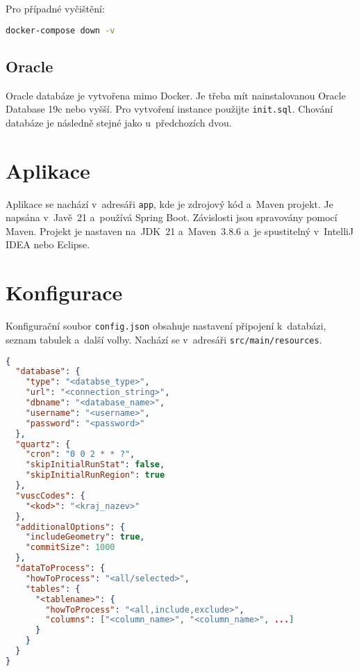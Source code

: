 Pro případné vyčištění:
\begin{lstlisting}[language=bash]
docker-compose down -v
\end{lstlisting}

\subsection*{Oracle}
Oracle databáze je vytvořena mimo Docker. Je třeba mít nainstalovanou Oracle Database 19c nebo vyšší. Pro vytvoření instance použijte \texttt{init.sql}. 
Chování databáze je následně stejné jako u~předchozích dvou.

\section*{Aplikace}
Aplikace se nachází v~adresáři \texttt{app}, kde je zdrojový kód a~Maven projekt. Je napsána v~Javě~21 a~používá Spring Boot. Závislosti jsou spravovány pomocí Maven. 
Projekt je nastaven na~JDK~21 a~Maven~3.8.6 a~je spustitelný v~IntelliJ IDEA nebo Eclipse.

\section*{Konfigurace}
Konfigurační soubor \texttt{config.json} obsahuje nastavení připojení k~databázi, seznam tabulek a~další volby. Nachází se v~adresáři \texttt{src/main/resources}.

\newpage

\begin{lstlisting}[language=json, caption={Příklad konfiguračního souboru}]
{
  "database": {
    "type": "<databse_type>",
    "url": "<connection_string>",
    "dbname": "<database_name>",
    "username": "<username>",
    "password": "<password>"
  },
  "quartz": {
    "cron": "0 0 2 * * ?",
    "skipInitialRunStat": false,
    "skipInitialRunRegion": true
  },
  "vuscCodes": {
    "<kod>": "<kraj_nazev>"
  },
  "additionalOptions": {
    "includeGeometry": true,
    "commitSize": 1000
  },
  "dataToProcess": {
    "howToProcess": "<all/selected>",
    "tables": {
      "<tablename>": {
        "howToProcess": "<all,include,exclude>",
        "columns": ["<column_name>", "<column_name>", ...]
      }
    }
  }
}
\end{lstlisting}

\newpage


